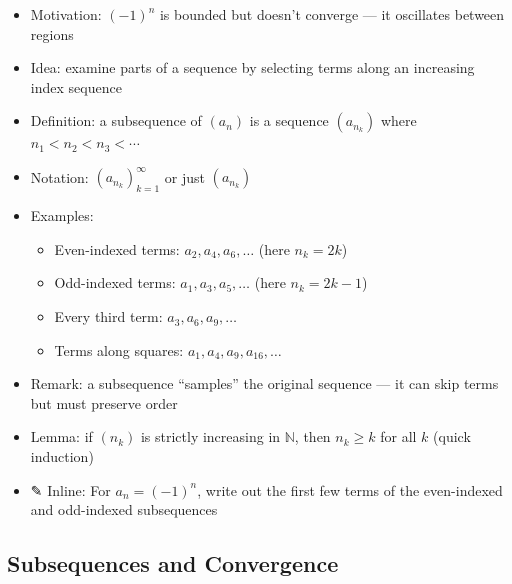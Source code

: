 \documentclass[
  10pt,
  letterpaper,
]{scrbook}
\providecommand{\tightlist}{%
  \setlength{\itemsep}{0pt}\setlength{\parskip}{0pt}}
\newcommand{\NN}{\mathbb{N}}
\begin{document}
\begin{itemize}
\tightlist
\item
  Motivation: \((-1)^n\) is bounded but doesn't converge --- it
  oscillates between regions
\item
  Idea: examine parts of a sequence by selecting terms along an
  increasing index sequence
\item
  Definition: a subsequence of \((a_n)\) is a sequence \((a_{n_k})\)
  where \(n_1 < n_2 < n_3 < \cdots\)
\item
  Notation: \((a_{n_k})_{k=1}^{\infty}\) or just \((a_{n_k})\)
\item
  Examples:

  \begin{itemize}
  \tightlist
  \item
    Even-indexed terms: \(a_2, a_4, a_6, \ldots\) (here \(n_k = 2k\))
  \item
    Odd-indexed terms: \(a_1, a_3, a_5, \ldots\) (here \(n_k = 2k-1\))
  \item
    Every third term: \(a_3, a_6, a_9, \ldots\)
  \item
    Terms along squares: \(a_1, a_4, a_9, a_{16}, \ldots\)
  \end{itemize}
\item
  Remark: a subsequence ``samples'' the original sequence --- it can
  skip terms but must preserve order
\item
  Lemma: if \((n_k)\) is strictly increasing in \(\NN\), then
  \(n_k \geq k\) for all \(k\) (quick induction)
\item
  ✎ Inline: For \(a_n = (-1)^n\), write out the first few terms of the
  even-indexed and odd-indexed subsequences
\end{itemize}

\subsection{Subsequences and
Convergence}\label{subsequences-and-convergence}
\end{document}
